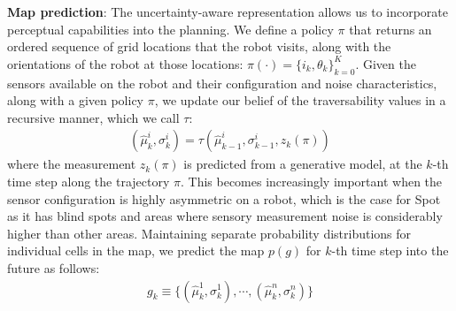 \documentclass[letterpaper, 10pt, conference]{ieeeconf}      %
\newcommand{\ph}[1]{{\textbf{#1}:}} %
\newcommand{\rev}[1]{{\color{blue}#1}} %
\begin{document}
\ph{Map prediction}
The uncertainty-aware representation allows us to incorporate perceptual capabilities %
into the planning. We define a policy $\pi$ that returns an ordered sequence of grid locations that the robot visits, along with the orientations of the robot at those locations: $\pi(\cdot)=\{i_k, \theta_k\}_{k=0}^K$. Given the sensors available on the robot and their configuration and noise characteristics, along with a given policy $\pi$, we update our belief of the traversability values in a recursive manner, which we call $\tau$:
\begin{align}
 (\hat{\mu}^i_k, \sigma^i_k) =\tau(\hat{\mu}^i_{k-1}, \sigma^i_{k-1}, z_{k}(\pi) )
\end{align}
where the measurement $z_k(\pi)$ is predicted from a generative model, at the $k$-th time step along the trajectory $\pi$. This becomes increasingly important when the sensor configuration is highly asymmetric on a robot, which is the case for Spot as it has blind spots and areas where sensory measurement noise is considerably higher than other areas.
Maintaining separate probability distributions for individual cells in the map, we predict the map $p(g)$ for $k$-th time step into the future as follows: 
\begin{align}
 g_k \equiv \{(\hat{\mu}^1_k,\sigma^1_k),\cdots,(\hat{\mu}^n_k,\sigma^n_k)\}   
\end{align}
\end{document}
